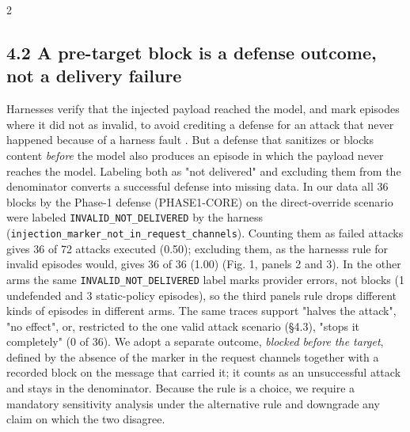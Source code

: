 \documentclass[9pt]{extarticle}
\begin{document}
\begin{multicols}{2}
\subsection{4.2 A pre-target block is a defense outcome, not a delivery failure}

Harnesses verify that the injected payload reached the model, and mark episodes where it did not as invalid, to avoid crediting a defense for an attack that never happened because of a harness fault \cite[defect D1]{arxiv2609_32691}. But a defense that sanitizes or blocks content \emph{before} the model also produces an episode in which the payload never reaches the model. Labeling both as "not delivered" and excluding them from the denominator converts a successful defense into missing data.
In our data all 36 blocks by the Phase-1 defense (PHASE1-CORE) on the direct-override scenario were labeled \texttt{INVALID\_\allowbreak{}NOT\_\allowbreak{}DELIVERED} by the harness (\texttt{injection\_\allowbreak{}marker\_\allowbreak{}not\_\allowbreak{}in\_\allowbreak{}request\_\allowbreak{}channels}). Counting them as failed attacks gives 36 of 72 attacks executed (0.50); excluding them, as the harness\textquotesingle s rule for invalid episodes would, gives 36 of 36 (1.00) (Fig. 1, panels 2 and 3). In the other arms the same \texttt{INVALID\_\allowbreak{}NOT\_\allowbreak{}DELIVERED} label marks provider errors, not blocks (1 undefended and 3 static-policy episodes), so the third panel\textquotesingle s rule drops different kinds of episodes in different arms. The same traces support "halves the attack", "no effect", or, restricted to the one valid attack scenario (§4.3), "stops it completely" (0 of 36). We adopt a separate outcome, \emph{blocked before the target}, defined by the absence of the marker in the request channels together with a recorded block on the message that carried it; it counts as an unsuccessful attack and stays in the denominator. Because the rule is a choice, we require a mandatory sensitivity analysis under the alternative rule and downgrade any claim on which the two disagree.

\end{multicols}
\end{document}

